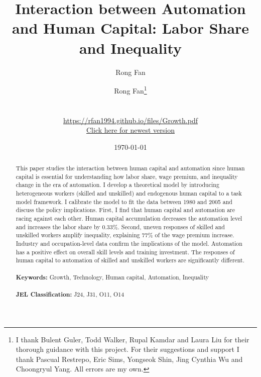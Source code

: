 \documentclass[12pt]{article}
\date{}
\author{Rong Fan}
\begin{document}
\begin{titlepage}
\title{Interaction between Automation and Human Capital: Labor Share and Inequality}
\author{Rong Fan\thanks{I thank Bulent Guler, Todd Walker, Rupal Kamdar and Laura Liu for their thorough guidance with this project. For their suggestions and support I thank Pascual Restrepo, Eric Sims, Yongseok Shin, Jing Cynthia Wu and Choongryul Yang. All errors are my own.} 
\\
\\
\\ \href{https://rfan1994.github.io/files/Growth.pdf}{https://rfan1994.github.io/files/Growth.pdf}
\\ \href{https://rfan1994.github.io/files/Growth.pdf}{Click here for newest version}}
\date{\today}
\maketitle

\begin{abstract}
\noindent This paper studies the interaction between human capital and automation since human capital is essential for understanding how labor share, wage premium, and inequality change in the era of automation. I develop a theoretical model by introducing heterogeneous workers (skilled and unskilled) and endogenous human capital to a task model framework. I calibrate the model to fit the data between 1980 and 2005 and discuss the policy implications. First, I find that human capital and automation are racing against each other. Human capital accumulation decreases the automation level and increases the labor share by 0.33\%. Second, uneven responses of skilled and unskilled workers amplify inequality, explaining 77\% of the wage premium increase. Industry and occupation-level data confirm the implications of the model. Automation has a positive effect on overall skill levels and training investment. The responses of human capital to automation of skilled and unskilled workers are significantly different.  \\
\vspace{0in}\\
\noindent\textbf{Keywords:} Growth, Technology, Human capital, Automation, Inequality\\
\vspace{0in}\\
\noindent\textbf{JEL Classification: } J24, J31, O11, O14\\

\bigskip
\end{abstract}
\setcounter{page}{0}
\thispagestyle{empty}
\end{titlepage}
\pagebreak \newpage
\end{document}
